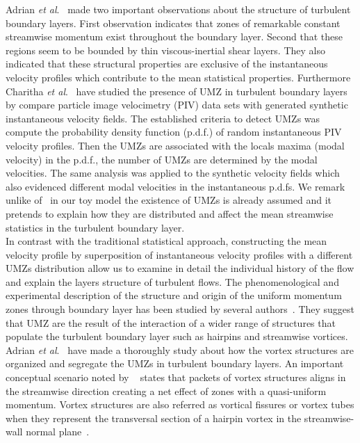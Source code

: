 \documentclass[aps,reprint,amsmath,amssymb,pra]{revtex4-1}%
\begin{document}
Adrian \textit{et al}.~\cite{mca1995} made two important observations about the structure of turbulent boundary layers. First observation indicates that zones of remarkable constant streamwise momentum exist throughout the boundary layer. Second that these regions seem to be bounded by thin viscous-inertial shear layers.  They also indicated that these structural properties are exclusive of the instantaneous velocity profiles which contribute to the mean statistical properties. Furthermore  Charitha \textit{et al}.~\cite{umz2015}
have studied the presence of UMZ in turbulent boundary layers by compare particle image velocimetry (PIV) data sets with generated synthetic instantaneous velocity fields. The established criteria to detect UMZs was compute the probability density function (p.d.f.) of random instantaneous PIV velocity profiles. Then the UMZs are associated with the locals maxima (modal velocity) in the p.d.f., the number of UMZs are determined by the modal velocities. The same analysis was applied to the synthetic velocity fields which also evidenced different modal velocities in the instantaneous p.d.fs. We remark unlike of~\cite{umz2015} in our toy model the existence of UMZs is already assumed and it pretends to explain how they are distributed and affect the mean streamwise statistics in the turbulent boundary layer. \\
In contrast with the traditional statistical approach, constructing the mean velocity profile by superposition of instantaneous velocity profiles with a different UMZs distribution allow us to examine in detail the individual history of the flow and explain the layers structure of turbulent flows.
The phenomenological and experimental description of the structure and origin of the uniform momentum zones through boundary layer has been studied by several authors~\citep{mca1995,amt2000,umz2015}. They suggest that UMZ are the result of the interaction of a wider range of structures that populate the turbulent boundary layer\cite{amt2000} such as hairpins and streamwise vortices. Adrian \textit{et al}.~\cite{amt2000} have made a thoroughly  study about how the vortex structures are organized and segregate the UMZs in turbulent boundary layers. An important conceptual scenario noted by ~\cite{amt2000} states that packets of vortex structures aligns in the streamwise direction creating a net effect of zones with a quasi-uniform momentum. Vortex structures are also referred as vortical fissures or vortex tubes when they represent the transversal section of a hairpin vortex in the streamwise-wall normal plane~\cite{amt2000}.  
\end{document}
